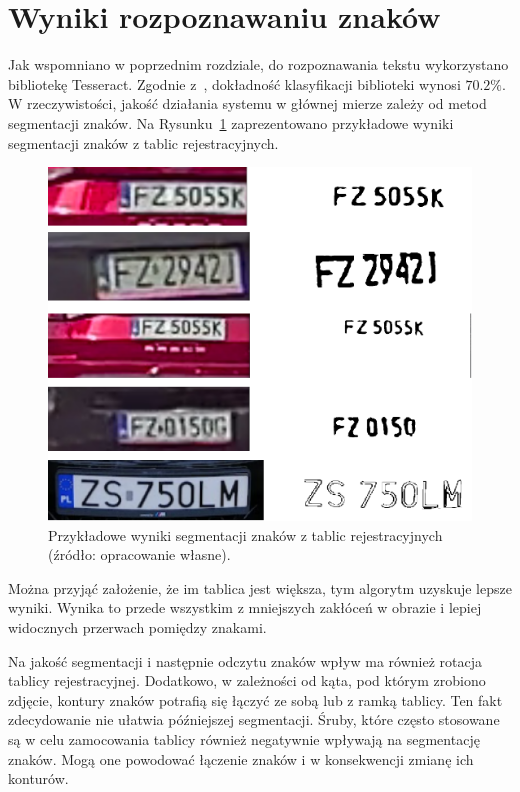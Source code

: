 \section{Wyniki rozpoznawaniu znaków}
Jak wspomniano w poprzednim rozdziale, do rozpoznawania tekstu wykorzystano bibliotekę Tesseract.
Zgodnie z~\cite{sym12050715}, dokładność klasyfikacji biblioteki wynosi $70.2\%$.
\\W rzeczywistości, jakość działania systemu w głównej mierze zależy od metod segmentacji znaków.
Na Rysunku~\ref{fig:plates} zaprezentowano przykładowe wyniki segmentacji znaków z tablic rejestracyjnych.
\begin{figure}[!ht]
    \centering
    \includegraphics[scale=0.4]{Pictures/plates}
    \caption{Przykładowe wyniki segmentacji znaków z tablic rejestracyjnych (źródło: opracowanie własne).}
    \label{fig:plates}
\end{figure}
\FloatBarrier
Można przyjąć założenie, że im tablica jest większa, tym algorytm uzyskuje lepsze wyniki.
Wynika to przede wszystkim z mniejszych zakłóceń w obrazie i lepiej widocznych przerwach pomiędzy znakami.

Na jakość segmentacji i następnie odczytu znaków wpływ ma również rotacja tablicy rejestracyjnej.
Dodatkowo, w zależności od kąta, pod którym zrobiono zdjęcie, kontury znaków potrafią się łączyć ze sobą lub z ramką tablicy.
Ten fakt zdecydowanie nie ułatwia późniejszej segmentacji.
Śruby, które często stosowane są w celu zamocowania tablicy również negatywnie wpływają na segmentację znaków.
Mogą one powodować łączenie znaków i w konsekwencji zmianę ich konturów.

